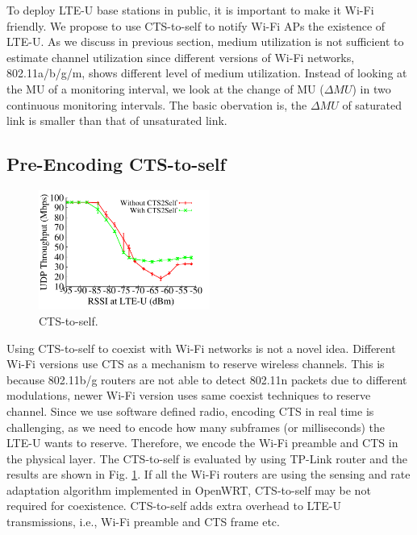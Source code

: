 

To deploy LTE-U base stations in public,
it is important to make it Wi-Fi friendly.  
We propose to use CTS-to-self to notify Wi-Fi APs the existence
of LTE-U. 
As we discuss in previous section, medium utilization is not sufficient
to estimate channel utilization since different 
versions of Wi-Fi networks, 802.11a/b/g/m, 
shows different level of medium utilization. 
Instead of looking at the MU of a monitoring interval, 
we look at the change of MU ($\Delta{MU}$) in two continuous monitoring intervals. 
The basic obervation is, the $\Delta{MU}$ of saturated link is smaller
than that of unsaturated link. 


\subsection{Pre-Encoding CTS-to-self}


\begin{figure}[!ht]
 \centering
    \includegraphics[width=0.5\textwidth]{./figures/cts2self_power}
 \caption{CTS-to-self.}
  \label{fig:cts2self_power}
\end{figure}

Using CTS-to-self to coexist with Wi-Fi networks is not a novel idea. 
Different Wi-Fi versions use CTS as a mechanism to reserve 
wireless channels. 
This is because 802.11b/g routers are not able to detect
802.11n packets due to different modulations, 
newer Wi-Fi version uses same coexist techniques to 
reserve channel. 
Since we use software defined radio, encoding CTS
in real time is challenging, 
as we need to encode how many subframes (or milliseconds) the LTE-U wants
to reserve. 
Therefore, we encode the Wi-Fi preamble and CTS in the physical layer. 
The CTS-to-self is evaluated by using TP-Link router
and the results are shown in Fig. \ref{fig:cts2self_power}.
If all the Wi-Fi routers are using the sensing and 
rate adaptation algorithm implemented in OpenWRT, 
CTS-to-self may be not required for coexistence. 
CTS-to-self adds extra overhead to LTE-U transmissions,
i.e., Wi-Fi preamble and CTS frame etc. 



